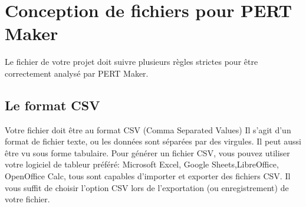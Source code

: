 \documentclass{article}
\begin{document}
\section{Conception de fichiers pour PERT Maker}
Le fichier de votre projet doit suivre plusieurs règles strictes pour être correctement analysé par PERT Maker.

\subsection{Le format CSV}
Votre fichier doit être au format CSV (Comma Separated Values)
Il s'agit d'un format de fichier texte, ou les données sont séparées par des virgules.
Il peut aussi être vu sous forme tabulaire.
Pour générer un fichier CSV, vous pouvez utiliser votre logiciel de tableur préféré:
Microsoft Excel, Google Sheets,LibreOffice, OpenOffice Calc, tous sont capables d'importer
et exporter des fichiers CSV.
Il vous suffit de choisir l'option CSV lors de l'exportation (ou enregistrement) de votre fichier.

\newpage
\end{document}

